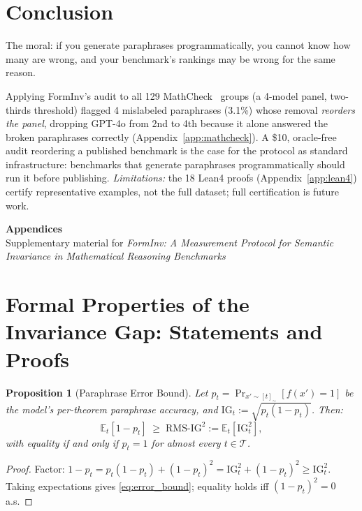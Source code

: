 \documentclass{article}
\newcommand{\IG}{\mathrm{IG}}
\newcommand{\Eclass}[1]{[#1]_{\sim}}
\newtheorem{proposition}{Proposition}
\begin{document}
\section{Conclusion}
\label{sec:conclusion}

The moral: if you generate paraphrases programmatically, you cannot know how many are wrong, and your benchmark's rankings may be wrong for the same reason.

Applying FormInv's audit to all 129 MathCheck~\citep{zhou2024mathcheck} groups (a 4-model panel, two-thirds threshold) flagged 4 mislabeled paraphrases (3.1\%) whose removal \emph{reorders the panel}, dropping GPT-4o from 2nd to 4th because it alone answered the broken paraphrases correctly (Appendix~\ref{app:mathcheck}). A \$10, oracle-free audit reordering a published benchmark is the case for the protocol as standard infrastructure: benchmarks that generate paraphrases programmatically should run it before publishing.
\textit{Limitations:} the 18 Lean4 proofs (Appendix~\ref{app:lean4}) certify representative examples, not the full dataset; full certification is future work.




\clearpage
\appendix
\onecolumn
\begin{center}
{\Large\textbf{Appendices}}\\[4pt]
{\normalsize Supplementary material for \emph{FormInv: A Measurement Protocol for Semantic Invariance in Mathematical Reasoning Benchmarks}}
\end{center}
\vspace{1em}

\section{Formal Properties of the Invariance Gap: Statements and Proofs}
\label{app:proofs}

\begin{proposition}[Paraphrase Error Bound]
\label{prop:error_bound}
Let $p_t = \Pr_{x'\sim\Eclass{t}}[f(x')=1]$ be the model's per-theorem paraphrase accuracy,
and $\IG_t := \sqrt{p_t(1-p_t)}$.
Then:
\begin{equation}
  \mathbb{E}_t[1 - p_t] \;\geq\; \mathrm{RMS\text{-}IG}^2 := \mathbb{E}_t[\IG_t^2],
  \label{eq:error_bound}
\end{equation}
with equality if and only if $p_t = 1$ for almost every $t \in \mathcal{T}$.
\end{proposition}
\begin{proof}
Factor: $1-p_t = p_t(1-p_t) + (1-p_t)^2 = \IG_t^2 + (1-p_t)^2 \geq \IG_t^2$.
Taking expectations gives \eqref{eq:error_bound}; equality holds iff $(1-p_t)^2=0$ a.s.
\end{proof}
\end{document}
